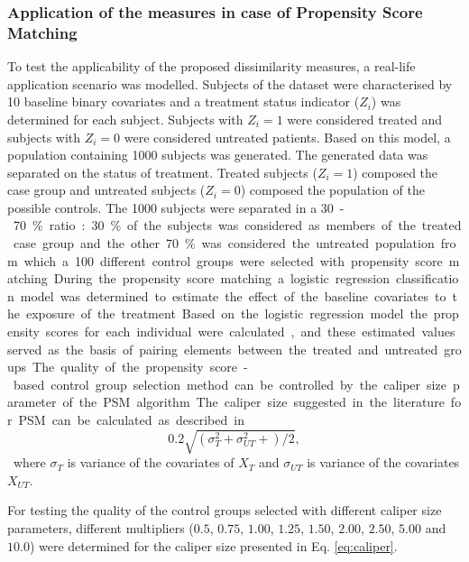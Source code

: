 		\subsubsection{Application of the measures in case of Propensity Score Matching}
		\label{subseq:qr_scen}
										
		To test the applicability of the proposed dissimilarity measures, a real-life application scenario was modelled. Subjects of the dataset were characterised by 10 baseline binary covariates and a treatment status indicator ($Z_i$) was determined for each subject. Subjects with $Z_i=1$ were considered treated and subjects with $Z_i=0$ were considered untreated patients. Based on this model, a population containing 1000 subjects was generated. The generated data was separated on the status of treatment. Treated subjects ($Z_i=1$) composed the case group and untreated subjects ($Z_i=0$) composed the population of the possible controls. The 1000 subjects were separated in a  \SI{30}-\SI{70}{\percent} ratio: \SI{30}{\percent} of the subjects was considered as members of the treated case group and the other \SI{70}{\percent} was considered the untreated population from which a 100 different control groups were selected with propensity score matching. During the propensity score matching a logistic regression classification model was determined to estimate the effect of the baseline covariates to the exposure of the treatment. Based on the logistic regression model the propensity scores for each individual were calculated, and these estimated values served as the basis of pairing elements between the treated and untreated groups.
										
		The quality of the propensity score-based control group selection method can be controlled by the caliper size parameter of the PSM algorithm. The caliper size suggested in the literature for PSM can be calculated as described in \cite{austin2011introduction}. 				
		\begin{equation}
			0.2\sqrt{(\sigma_T^2+\sigma_{UT}^2+)/2},
			\label{eq:caliper}
		\end{equation}
		where $\sigma_T$ is variance of the covariates of $X_T$ and $\sigma_{UT}$ is variance of the covariates $X_{UT}$. 
		  
		For testing the quality of the control groups selected with different caliper size parameters, different multipliers ($0.5$, $0.75$, $1.00$, $1.25$, $1.50$, $2.00$, $2.50$, $5.00$ and $10.0$) were determined for the caliper size presented in Eq. \ref{eq:caliper}. 
		  
